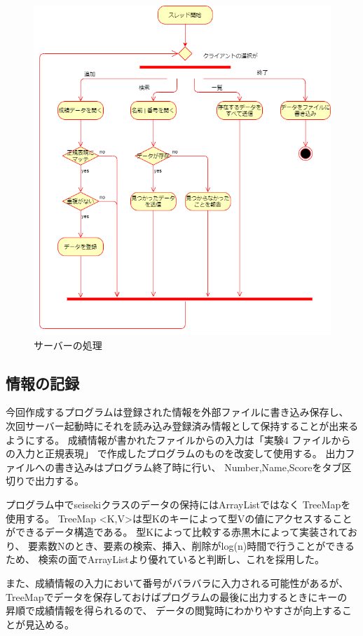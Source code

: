 \documentclass[dvipdfmx]{jsarticle}
\begin{document}
\begin{figure}[H]
  \centering
  \includegraphics[width=0.9\hsize]{../pic/flowchart2.png}
  \caption{サーバーの処理}
  \label{fc2}
\end{figure}

\subsection{情報の記録}
今回作成するプログラムは登録された情報を外部ファイルに書き込み保存し、
次回サーバー起動時にそれを読み込み登録済み情報として保持することが出来るようにする。
成績情報が書かれたファイルからの入力は「実験4 ファイルからの入力と正規表現」
で作成したプログラムのものを改変して使用する。
出力ファイルへの書き込みはプログラム終了時に行い、
Number,Name,Scoreをタブ区切りで出力する。

プログラム中でseisekiクラスのデータの保持にはArrayListではなく
TreeMapを使用する。
TreeMap \textless K,V\textgreater は型Kのキーによって型Vの値にアクセスすることができるデータ構造である。
型Kによって比較する赤黒木によって実装されており、
要素数Nのとき、要素の検索、挿入、削除がlog(n)時間で行うことができるため、
検索の面でArrayListより優れていると判断し、これを採用した。

また、成績情報の入力において番号がバラバラに入力される可能性があるが、
TreeMapでデータを保存しておけばプログラムの最後に出力するときにキーの
昇順で成績情報を得られるので、
データの閲覧時にわかりやすさが向上することが見込める。
\end{document}
